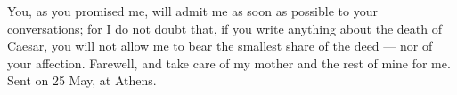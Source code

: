  You, as you promised me, will admit me as soon as possible to your conversations; for I do not doubt that, if you write anything about the death of Caesar, you will not allow me to bear the smallest share of the deed --- nor of your affection. Farewell, and take care of my mother and the rest of mine for me. Sent on 25 May, at Athens.
